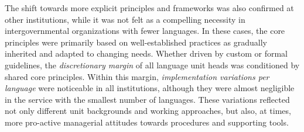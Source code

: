 \documentclass[output=paper]{langsci/langscibook}
\begin{document}
The shift towards more explicit principles and frameworks was also confirmed at other  institutions, while it was not felt as a compelling necessity in intergovernmental organizations with fewer languages. In these cases, the core  principles were primarily based on well-established practices as gradually inherited and adapted to changing needs. Whether driven by custom or formal guidelines, the \textit{discretionary margin} of all language unit heads was conditioned by shared core principles. Within this margin, \textit{implementation variations per language} were noticeable in all institutions, although they were almost negligible in the service with the smallest number of languages. These variations reflected not only different unit backgrounds and working approaches, but also, at times, more pro-active managerial attitudes towards  procedures and supporting tools.
\end{document}
